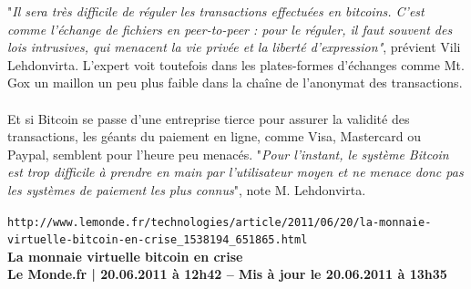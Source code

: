 \documentclass[11pt,twoside,a4paper]{article}
\begin{document}
"\emph{Il sera tr{\`e}s difficile de r{\'e}guler les transactions effectu{\'e}es en bitcoins. C'est comme l'{\'e}change de fichiers en peer-to-peer : pour le r{\'e}guler, il faut souvent des lois intrusives, qui menacent la vie priv{\'e}e et la libert{\'e} d'expression"}, pr{\'e}vient Vili Lehdonvirta. L'expert voit toutefois dans les plates-formes d'{\'e}changes comme Mt. Gox un maillon un peu plus faible dans la cha{\^i}ne de l'anonymat des transactions. ~\\

Et si Bitcoin se passe d'une entreprise tierce pour assurer la validit{\'e} des transactions, les g{\'e}ants du paiement en ligne, comme Visa, Mastercard ou Paypal, semblent pour l'heure peu menac{\'e}s. "\emph{Pour l'instant, le syst{\`e}me Bitcoin est trop difficile {\`a} prendre en main par l'utilisateur moyen et ne menace donc pas les syst{\`e}mes de paiement les plus connus}", note M. Lehdonvirta. %


\dotfill %

\texttt{http://www.lemonde.fr/technologies/article/2011/06/20/la-monnaie-virtuelle-bitcoin-en-crise\_1538194\_651865.html}~\\

\textbf{La monnaie virtuelle bitcoin en crise}~\\

\textbf{\small Le Monde.fr | 20.06.2011 {\`a} 12h42 -- Mis {\`a} jour le 20.06.2011 {\`a} 13h35 }~\\
\end{document}
